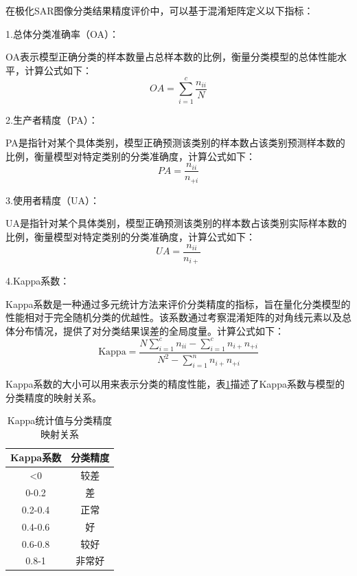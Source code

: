在极化SAR图像分类结果精度评价中，可以基于混淆矩阵定义以下指标：

1.总体分类准确率（OA）：

OA表示模型正确分类的样本数量占总样本数的比例，衡量分类模型的总体性能水平，计算公式如下：
\begin{equation}
    OA=\sum_{i=1}^{c}{\frac{n_{ii}}{N}}
\end{equation}

2.生产者精度（PA）：

PA是指针对某个具体类别，模型正确预测该类别的样本数占该类别预测样本数的比例，衡量模型对特定类别的分类准确度，计算公式如下：
\begin{equation}
    PA=\frac{n_{ii}}{n_{+i}}
\end{equation}

3.使用者精度（UA）：

UA是指针对某个具体类别，模型正确预测该类别的样本数占该类别实际样本数的比例，衡量模型对特定类别的分类准确度，计算公式如下：
\begin{equation}
    UA=\frac{n_{ii}}{{n_{i+}}}
\end{equation}

4.Kappa系数：

Kappa系数是一种通过多元统计方法来评价分类精度的指标，旨在量化分类模型的性能相对于完全随机分类的优越性。该系数通过考察混淆矩阵的对角线元素以及总体分布情况，提供了对分类结果误差的全局度量。计算公式如下：
\begin{equation}
    \mathrm{Kappa}=\frac{N\sum_{i=1}^{c}{n_{ii}}-\sum_{i=1}^{c}{n_{i+}n_{+i}}}{N^2-\sum_{i=1}^{n}{n_{i+}n_{+i}}}
\end{equation}

Kappa系数的大小可以用来表示分类的精度性能，表\ref{kappa}描述了Kappa系数与模型的分类精度的映射关系。
\begin{table}[ht]
    \caption{Kappa统计值与分类精度映射关系}
    \begin{tabular}{cc}
        \toprule[1.5bp]
        Kappa系数 & 分类精度 \\
        \midrule[0.75bp]
        <0      & 较差   \\
        0-0.2   & 差    \\
        0.2-0.4 & 正常   \\
        0.4-0.6 & 好    \\
        0.6-0.8 & 较好   \\
        0.8-1   & 非常好  \\
        \bottomrule[1.5bp]
    \end{tabular}
    \label{kappa}
\end{table}

